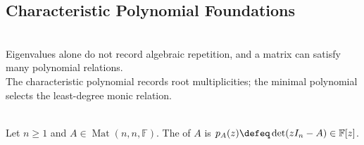 \subsection{Characteristic Polynomial Foundations}

\begin{motivation} \label{mot:characteristic-and-minimal-polynomials} \\
Eigenvalues alone do not record algebraic repetition, and a matrix can satisfy many polynomial relations.\\
The characteristic polynomial records root multiplicities; the minimal polynomial selects the least-degree monic relation.
\end{motivation}

\begin{definition} \label{def:matrix-characteristic-polynomial} \\
Let $n\geq1$ and $A\in\operatorname{Mat}(n,n,\mathbb{F})$. The  of $A$ is $p_A(z)\defeq\det(zI_n-A)\in\mathbb{F}[z]$.
\end{definition}

